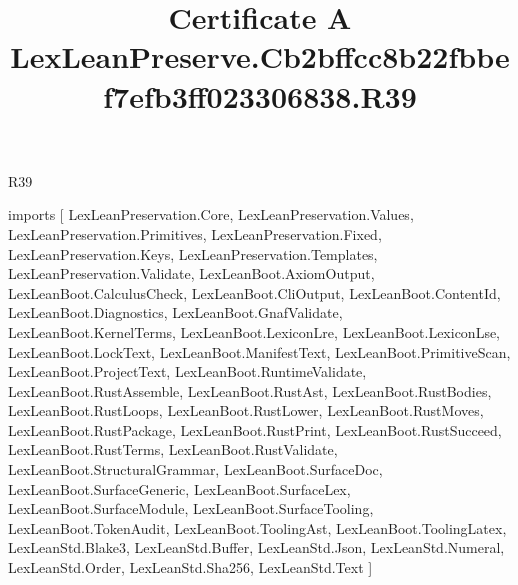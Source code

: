 \begin{lexlean}{R39}
\title{Certificate A LexLeanPreserve.Cb2bffcc8b22fbbef7efb3ff023306838.R39}
\begin{coremodule}
imports [
  LexLeanPreservation.Core,
  LexLeanPreservation.Values,
  LexLeanPreservation.Primitives,
  LexLeanPreservation.Fixed,
  LexLeanPreservation.Keys,
  LexLeanPreservation.Templates,
  LexLeanPreservation.Validate,
  LexLeanBoot.AxiomOutput,
  LexLeanBoot.CalculusCheck,
  LexLeanBoot.CliOutput,
  LexLeanBoot.ContentId,
  LexLeanBoot.Diagnostics,
  LexLeanBoot.GnafValidate,
  LexLeanBoot.KernelTerms,
  LexLeanBoot.LexiconLre,
  LexLeanBoot.LexiconLse,
  LexLeanBoot.LockText,
  LexLeanBoot.ManifestText,
  LexLeanBoot.PrimitiveScan,
  LexLeanBoot.ProjectText,
  LexLeanBoot.RuntimeValidate,
  LexLeanBoot.RustAssemble,
  LexLeanBoot.RustAst,
  LexLeanBoot.RustBodies,
  LexLeanBoot.RustLoops,
  LexLeanBoot.RustLower,
  LexLeanBoot.RustMoves,
  LexLeanBoot.RustPackage,
  LexLeanBoot.RustPrint,
  LexLeanBoot.RustSucceed,
  LexLeanBoot.RustTerms,
  LexLeanBoot.RustValidate,
  LexLeanBoot.StructuralGrammar,
  LexLeanBoot.SurfaceDoc,
  LexLeanBoot.SurfaceGeneric,
  LexLeanBoot.SurfaceLex,
  LexLeanBoot.SurfaceModule,
  LexLeanBoot.SurfaceTooling,
  LexLeanBoot.TokenAudit,
  LexLeanBoot.ToolingAst,
  LexLeanBoot.ToolingLatex,
  LexLeanStd.Blake3,
  LexLeanStd.Buffer,
  LexLeanStd.Json,
  LexLeanStd.Numeral,
  LexLeanStd.Order,
  LexLeanStd.Sha256,
  LexLeanStd.Text
]


\end{coremodule}
\end{lexlean}

